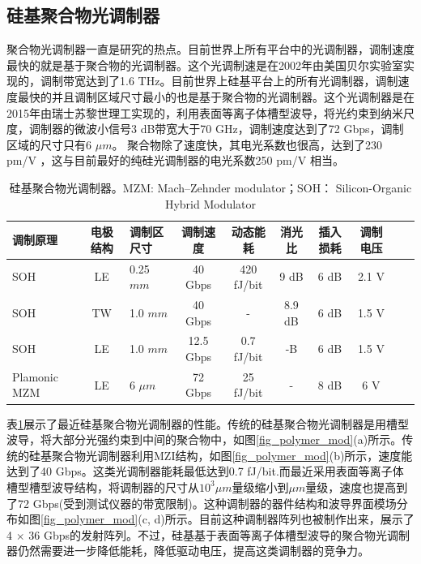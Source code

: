 \subsection{硅基聚合物光调制器}
聚合物光调制器一直是研究的热点。目前世界上所有平台中的光调制器，调制速度最快的就是基于聚合物的光调制器。这个光调制速是在2002年由美国贝尔实验室实现的，调制带宽达到了1.6 THz\cite{lee2002broadband}。目前世界上硅基平台上的所有光调制器，调制速度最快的并且调制区域尺寸最小的也是基于聚合物的光调制器。这个光调制器是在2015年由瑞士苏黎世理工实现的，利用表面等离子体槽型波导，将光约束到纳米尺度，调制器的微波小信号3 dB带宽大于70 GHz，调制速度达到了72 Gbps，调制区域的尺寸只有6  $\mu m$。 聚合物除了速度快，其电光系数也很高，达到了230 pm/V \cite{palmer2014high}，这与目前最好的纯硅光调制器的电光系数250 pm/V \cite{timurdogan2014ultralow}相当。
{
	\begin{table}[htb]
		\caption{硅基聚合物光调制器。MZM:  Mach–Zehnder modulator；SOH： Silicon-Organic Hybrid Modulator}
		\label{sil_polymer_mod}
		\centering
		\begin{tabular}[t]{p{1.5cm}cp{1.2cm}ccccccc}
			\hline
			调制原理 & 电极结构 & 调制区尺寸 & 调制速度 & 动态能耗 & 消光比 & 插入损耗 & 调制电压\\
			\hline
			SOH\cite{palmer2014high} & LE  & 0.25 $mm$ & 40 Gbps & 420 fJ/bit & 9 dB & 6 dB & 2.1 V\\
			SOH\cite{palmer2014high} & TW  & 1.0 $mm$ & 40 Gbps & - & 8.9 dB & 6 dB & 1.5 V\\	
			SOH\cite{koeber2015femtojoule} & LE  & 1.0 $mm$ & 12.5 Gbps & 0.7 fJ/bit & -B & 6 dB & 1.5 V\\			
			Plamonic MZM\cite{haffner2015all} & LE  & 6 $\mu m$ & 72 Gbps & 25 fJ/bit & - & 8 dB & 6 V\\
			\hline
		\end{tabular}
	\end{table}
}
表\ref{sil_polymer_mod}展示了最近硅基聚合物光调制器的性能。传统的硅基聚合物光调制器是用槽型波导\cite{almeida2004guiding}，将大部分光强约束到中间的聚合物中，如图\ref{fig_polymer_mod}(a)所示\cite{palmer2014high,liu2015recent}。传统的硅基聚合物光调制器利用MZI结构，如图\ref{fig_polymer_mod}(b)所示，速度能达到了40 Gbps。这类光调制器能耗最低达到0.7 fJ/bit.而最近采用表面等离子体槽型槽型波导结构，将调制器的尺寸从$10^3 \mu m$量级缩小到$\mu m$量级，速度也提高到了72 Gbps(受到测试仪器的带宽限制)\cite{haffner2015all}。这种调制器的器件结构和波导界面模场分布如图\ref{fig_polymer_mod}(c, d)所示。目前这种调制器阵列也被制作出来，展示了 4 $\times$ 36 Gbps的发射阵列\cite{heni2015high}。不过，硅基基于表面等离子体槽型波导的聚合物光调制器仍然需要进一步降低能耗，降低驱动电压，提高这类调制器的竞争力。
